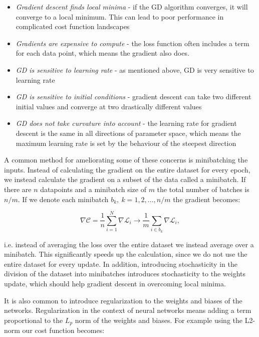 \begin{itemize}
    \item \textit{Gradient descent finds local minima} - 
        if the GD algorithm converges, it will converge to
        a local minimum. This can lead to poor performance
        in complicated cost function landscapes
    \item \textit{Gradients are expensive to compute} - 
        the loss function often includes a term for each
        data point, which means the gradient also does.
    \item \textit{GD is sensitive to learning rate} - 
        as mentioned above, GD is very sensitive to
        learning rate
    \item \textit{GD is sensitive to initial conditions} - 
        gradient descent can take two different initial values
        and converge at two drastically different values
    \item \textit{GD does not take curvature into account} - 
        the learning rate for gradient descent is the same
        in all directions of parameter space, which means
        the maximum learning rate is set by the behaviour of the
        steepest direction
\end{itemize}

A common method for ameliorating some of these concerns
is minibatching the inputs. Instead of calculating
the gradient on the entire dataset for every epoch,
we instead calculate the gradient on a subset
of the data called a minibatch.
If there are $n$ datapoints and a minibatch size
of $m$ the total number of batches is $n/m$.
If we denote each minibatch $b_k, \ k=1,2,\dots,n/m$
the gradient becomes:

\begin{equation}
 \nabla \mathcal{C} = \frac{1}{n} \sum_{i=1}^N
    \nabla \mathcal{L}_i \rightarrow
    \frac{1}{m} \sum_{i \in b_k} \nabla \mathcal{L}_i , 
\end{equation}

i.e. instead of averaging the loss over the entire dataset
we instead average over a minibatch.
This significantly speeds up the calculation, since
we do not use the entire dataset for every update.
In addition, introducing stochasticity in the
division of the dataset into minibatches introduces stochasticity
to the weights update, which should help gradient descent
in overcoming local minima.
\par
It is also common to introduce regularization to the weights
and biases of the networks. Regularization in the context
of neural networks means adding a term proportional
to the $L_p$ norm of the weights and biases.
For example using the L2-norm our cost function becomes:


